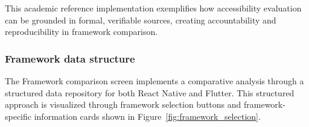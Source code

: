 This academic reference implementation exemplifies how accessibility evaluation can be grounded in formal, verifiable sources, creating accountability and reproducibility in framework comparison.

\subsubsection{Framework data structure}

The Framework comparison screen implements a comparative analysis through a structured data repository for both React Native and Flutter. This structured approach is visualized through framework selection buttons and framework-specific information cards shown in Figure~\ref{fig:framework_selection}.

\begin{figure}[ht]
    \centering
    \begin{subfigure}[b]{0.48\textwidth}
        \centering

\end{subfigure}
\end{figure}
